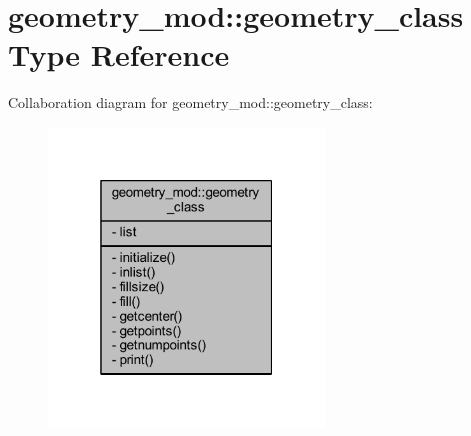 \hypertarget{structgeometry__mod_1_1geometry__class}{}\section{geometry\+\_\+mod\+:\+:geometry\+\_\+class Type Reference}
\label{structgeometry__mod_1_1geometry__class}


Collaboration diagram for geometry\+\_\+mod\+:\+:geometry\+\_\+class\+:\nopagebreak
\begin{figure}[H]
\begin{center}
\leavevmode
\includegraphics[width=208pt]{structgeometry__mod_1_1geometry__class__coll__graph}
\end{center}
\end{figure}
